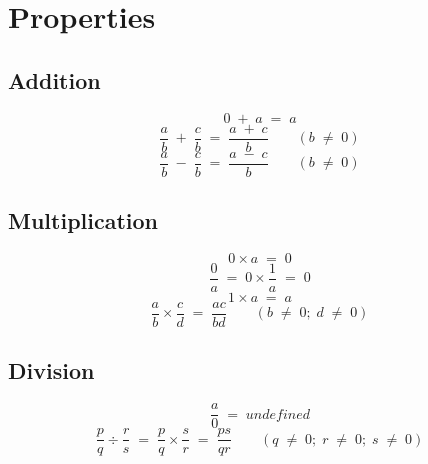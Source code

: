 \section{Properties}
\subsection{Addition}
\[0 \; + \; a \; = \; a\]
\[\frac{a}{b} \; + \; \frac{c}{b} \; = \; \frac{a \; + \; c}{b} \qquad (b \; \neq \; 0)\]
\[\frac{a}{b} \; - \; \frac{c}{b} \; = \; \frac{a \; - \; c}{b} \qquad (b \; \neq \; 0)\]
\subsection{Multiplication}
\[0 \times a \; = \; 0\]
\[\frac{0}{a} \; = \; 0 \times \frac{1}{a} \; = \; 0\]
\[1 \times a \; = \; a\]
\[\frac{a}{b} \times \frac{c}{d} \; = \; \frac{ac}{bd} \qquad (b \; \neq \; 0; \; d \; \neq \; 0)\]
\subsection{Division}
\[\frac{a}{0} \; = \; undefined\]
\[\frac{p}{q} \div \frac{r}{s} \; = \; \frac{p}{q} \times \frac{s}{r} \; = \; \frac{ps}{qr} \qquad (q \; \neq \; 0; \; r \; \neq \; 0; \; s \; \neq \; 0)\]
